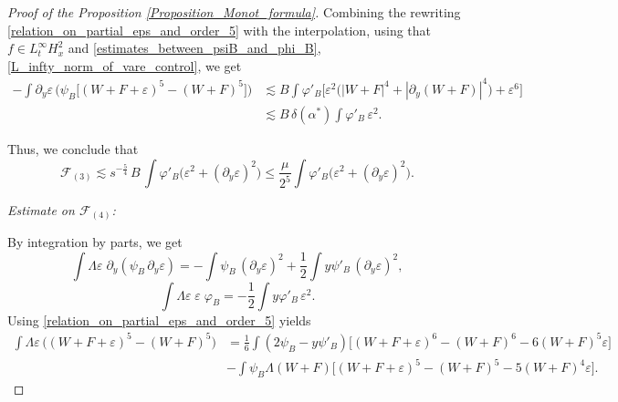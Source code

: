 \documentclass[16pt,english, oneside,reqno]{smfart}
\newcommand{\vare}{{\varepsilon}}
\newcommand{\vphi}{{\varphi}}
\begin{document}
\begin{proof}[Proof of the Proposition \ref{Proposition_Monot_formula}]
Combining the rewriting \eqref{relation_on_partial_eps_and_order_5} with the interpolation, using that $f \in L^{\infty}_t H^2_x$ and \eqref{estimates_between_psiB_and_phi_B}, \eqref{L_infty_norm_of_vare_control}, we get
\begin{equation}
\begin{split}
    - \int \partial_y \vare \, \Big( \psi_B \big[ (W+F+\vare)^5 - (W+F)^5 \big] \Big) 
    &\lesssim  B \int \vphi'_B \Big[ \vare^2 \big( |W+F|^4 + |\partial_y (W+F)|^4 \big) + \vare^6 \Big] \\
    &\lesssim B \, \delta(\alpha^*) \int \vphi'_B \, \vare^2.
\end{split}
\end{equation}

Thus, we conclude that 
\begin{equation}\label{mathcalF_estim_onF3}
     \mathcal{F}_{(3)} \lesssim s^{-\frac{5}{4}} \, B\, \int \vphi'_B \big( \vare^2 + (\partial_y\vare)^2 \big) \leq \frac{\mu}{2^{5}}\int \vphi'_B \big( \vare^2 + (\partial_y\vare)^2 \big).
\end{equation}

\textit{Estimate on $\mathcal{F}_{(4)}$:}

By integration by parts, we get
\begin{equation}
    \int \Lambda \vare\; \partial_y(\psi_B\, \partial_y \vare) = -\int \psi_B\, (\partial_y \vare)^2 + \frac{1}{2}\int y\psi'_B\, (\partial_y \vare)^2,
\end{equation}
\begin{equation}
    \int \Lambda \vare\; \vare \;\vphi_B = -\frac{1}{2}\int y\vphi'_B \,\vare^2.
\end{equation}
Using \eqref{relation_on_partial_eps_and_order_5} yields
\begin{equation}
\begin{split}
\int \Lambda \vare\, \big( (W+F+\vare)^5 - (W+F)^5 \big) 
& = \frac{1}{6}\int (2\psi_B-y\psi'_B)\big[ (W+F+\vare)^6 - (W+F)^6 - 6 (W+F)^5\vare\big]\\
& -\int \psi_B \Lambda(W+F)\big[ (W+F+\vare)^5 - (W+F)^5 -5 (W+F)^4 \vare\big].
\end{split}
\end{equation}


\end{proof}
\end{document}
